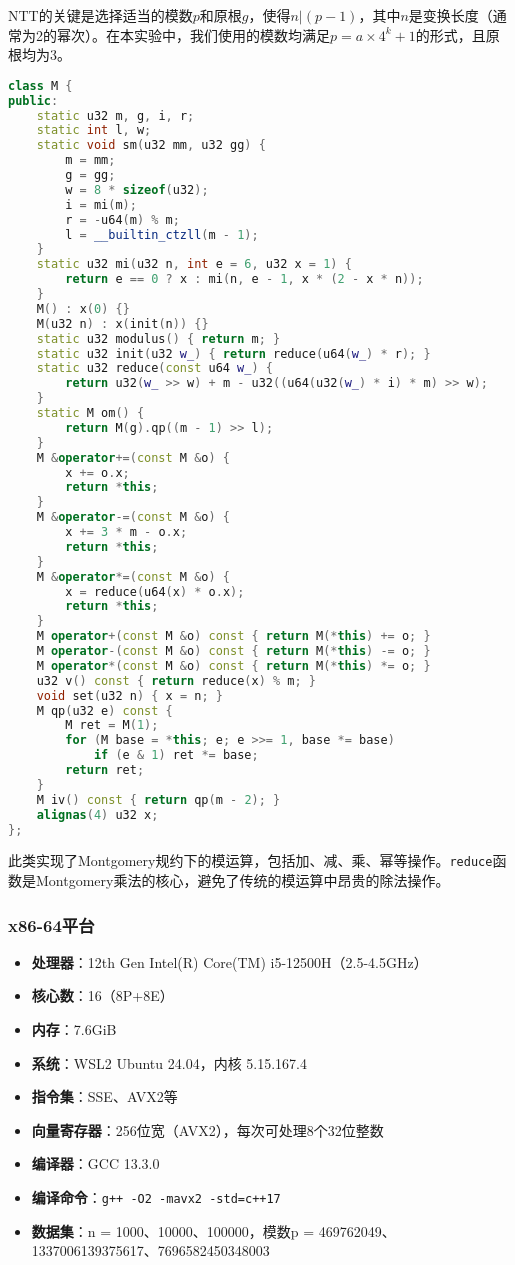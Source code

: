 \documentclass[a4paper,colorlinks=true,linkcolor=blue,urlcolor=blue,citecolor=green,bookmarks=true]{article}
\begin{document}
NTT的关键是选择适当的模数$p$和原根$g$，使得$n|(p-1)$，其中$n$是变换长度（通常为2的幂次）。在本实验中，我们使用的模数均满足$p = a \times 4^k + 1$的形式，且原根均为3\cite{longa2016}。

\begin{lstlisting}[language=C++]
class M {
public:
    static u32 m, g, i, r;
    static int l, w;
    static void sm(u32 mm, u32 gg) {
        m = mm;
        g = gg;
        w = 8 * sizeof(u32);
        i = mi(m);
        r = -u64(m) % m;
        l = __builtin_ctzll(m - 1);
    }
    static u32 mi(u32 n, int e = 6, u32 x = 1) {
        return e == 0 ? x : mi(n, e - 1, x * (2 - x * n));
    }
    M() : x(0) {}
    M(u32 n) : x(init(n)) {}
    static u32 modulus() { return m; }
    static u32 init(u32 w_) { return reduce(u64(w_) * r); }
    static u32 reduce(const u64 w_) {
        return u32(w_ >> w) + m - u32((u64(u32(w_) * i) * m) >> w);
    }
    static M om() {
        return M(g).qp((m - 1) >> l);
    }
    M &operator+=(const M &o) {
        x += o.x;
        return *this;
    }
    M &operator-=(const M &o) {
        x += 3 * m - o.x;
        return *this;
    }
    M &operator*=(const M &o) {
        x = reduce(u64(x) * o.x);
        return *this;
    }
    M operator+(const M &o) const { return M(*this) += o; }
    M operator-(const M &o) const { return M(*this) -= o; }
    M operator*(const M &o) const { return M(*this) *= o; }
    u32 v() const { return reduce(x) % m; }
    void set(u32 n) { x = n; }
    M qp(u32 e) const {
        M ret = M(1);
        for (M base = *this; e; e >>= 1, base *= base)
            if (e & 1) ret *= base;
        return ret;
    }
    M iv() const { return qp(m - 2); }
    alignas(4) u32 x;
};
\end{lstlisting}

此类实现了Montgomery规约下的模运算，包括加、减、乘、幂等操作。\verb|reduce|函数是Montgomery乘法的核心，避免了传统的模运算中昂贵的除法操作。


\subsubsection{x86-64平台}
\begin{itemize}
  \item \textbf{处理器}：12th Gen Intel(R) Core(TM) i5-12500H（2.5-4.5GHz）
  \item \textbf{核心数}：16（8P+8E）
  \item \textbf{内存}：7.6GiB
  \item \textbf{系统}：WSL2 Ubuntu 24.04，内核 5.15.167.4
  \item \textbf{指令集}：SSE、AVX2等
  \item \textbf{向量寄存器}：256位宽（AVX2），每次可处理8个32位整数
  \item \textbf{编译器}：GCC 13.3.0
  \item \textbf{编译命令}：\verb|g++ -O2 -mavx2 -std=c++17|
  \item \textbf{数据集}：n = 1000、10000、100000，模数p = 469762049、1337006139375617、7696582450348003
\end{itemize}
\end{document}

